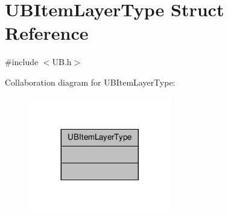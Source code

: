 \hypertarget{struct_u_b_item_layer_type}{\section{U\-B\-Item\-Layer\-Type Struct Reference}
\label{db/d30/struct_u_b_item_layer_type}
}


{\ttfamily \#include $<$U\-B.\-h$>$}



Collaboration diagram for U\-B\-Item\-Layer\-Type\-:
\nopagebreak
\begin{figure}[H]
\begin{center}
\leavevmode
\includegraphics[width=176pt]{d7/d13/struct_u_b_item_layer_type__coll__graph}
\end{center}
\end{figure}

